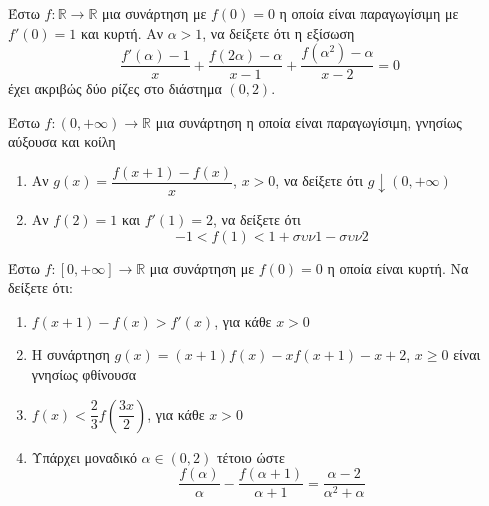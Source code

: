 \documentclass{presentation}
\begin{document}
\begin{askisi}
  Έστω $f:\mathbb{R}\to\mathbb{R}$ μια συνάρτηση με $f(0)=0$ η οποία είναι παραγωγίσιμη με $f'(0)=1$ και κυρτή. Αν $α>1$, να δείξετε ότι η εξίσωση
  $$\frac{f'(α)-1}{x}+\frac{f(2α)-α}{x-1}+\frac{f(α^2)-α}{x-2}=0$$
  έχει ακριβώς δύο ρίζες στο διάστημα $(0,2)$.
\end{askisi}

\begin{askisi}
  Έστω $f:(0,+\infty)\to\mathbb{R}$ μια συνάρτηση η οποία είναι παραγωγίσιμη, γνησίως αύξουσα και κοίλη
  \begin{enumerate}[<+->]
    \item Αν $g(x)=\dfrac{f(x+1)-f(x)}{x}$, $x>0$, να δείξετε ότι $g\downarrow (0,+\infty)$
    \item Αν $f(2)=1$ και $f'(1)=2$, να δείξετε ότι
          $$-1<f(1)<1+συν1-συν2$$
  \end{enumerate}
\end{askisi}

\begin{askisi}
  Έστω $f:[0,+\infty]\to\mathbb{R}$ μια συνάρτηση με $f(0)=0$ η οποία είναι κυρτή. Να δείξετε ότι:
  \begin{enumerate}[<+->]
    \item $f(x+1)-f(x)>f'(x)$, για κάθε $x>0$
    \item Η συνάρτηση $g(x)=(x+1)f(x)-xf(x+1)-x+2$, $x\ge 0$ είναι γνησίως φθίνουσα
    \item $f(x)<\dfrac{2}{3}f\left(\dfrac{3x}{2}\right)$, για κάθε $x>0$
    \item Υπάρχει μοναδικό $α\in (0,2)$ τέτοιο ώστε
          $$\frac{f(α)}{α}-\frac{f(α+1)}{α+1}=\frac{α-2}{α^2+α}$$
  \end{enumerate}
\end{askisi}

\moodle
\end{document}
